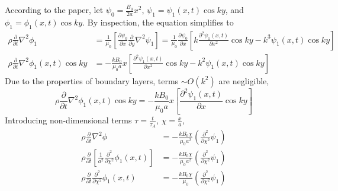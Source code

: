 \documentclass{article}
\begin{document}
According to the paper, let $\psi_0=\frac{B_0}{2a}x^2$, $\psi_1=\psi_1\left( x,t \right) \cos{ky}$, and $\phi_1=\phi_1\left( x,t \right) \cos{ky}$. By inspection, the equation simplifies to
\begin{equation}
    \begin{split}
        \rho \frac{\partial}{\partial t} \nabla ^2 \phi_1 &= \frac{1}{\mu_0} \left[ \frac{\partial \psi_0}{\partial x} \frac{\partial}{\partial y} \nabla ^2 \psi_1 \right] = \frac{1}{\mu_0} \frac{\partial \psi_0}{\partial x} \left[ k \frac{\partial^2 \psi_1\left( x,t \right) }{\partial x^2} \cos{ky} - k^{3} \psi_1\left( x,t \right) \cos{ky} \right] \\
        \rho \frac{\partial}{\partial t} \nabla ^2 \phi_1(x,t)\cos{ky} &= -\frac{kB_0}{\mu_0 a} x \left[ \frac{\partial^2 \psi_1\left( x,t \right) }{\partial x^2} \cos{ky} - k^{2} \psi_1\left( x,t \right) \cos{ky} \right]
    \end{split}
\end{equation} 
Due to the properties of boundary layers, terms $\sim O(k^2)$ are negligible,
\begin{equation}
    \rho \frac{\partial}{\partial t} \nabla ^2 \phi_1(x,t)\cos{ky} = -\frac{kB_0}{\mu_0 a} x \left[ \frac{\partial^2 \psi_1\left( x,t \right) }{\partial x} \cos{ky} \right]
\end{equation} 
Introducing non-dimensional terms $\tau=\frac{t}{\tau_A}$, $\chi=\frac{x}{a}$,
\begin{equation}
    \begin{split}
        \rho \frac{\partial}{\partial t} \nabla^2 \phi &= -\frac{kB_0 \chi}{\mu_0 a^2} \left( \frac{\partial ^2}{\partial \chi^2} \psi_1 \right) \\
        \rho \frac{\partial}{\partial t} \left[ \frac{1}{a^2} \frac{\partial^2}{\partial \chi^2} \phi_1(x,t) \right] &= -\frac{kB_0 \chi}{\mu_0 a^2} \left( \frac{\partial ^2}{\partial \chi^2} \psi_1 \right) \\
        \rho \frac{\partial}{\partial t} \frac{\partial^2}{\partial \chi^2} \phi_1(x,t) &= -\frac{kB_0 \chi}{\mu_0} \left( \frac{\partial ^2}{\partial \chi^2} \psi_1 \right)
    \end{split}
\end{equation} 
\end{document}
